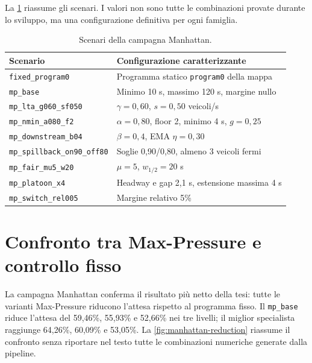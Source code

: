 \documentclass[12pt,a4paper,oneside]{report}
\numberwithin{equation}{chapter}
\begin{document}
La \cref{tab:manhattan-scenarios} riassume gli scenari. I valori non sono tutte
le combinazioni provate durante lo sviluppo, ma una configurazione definitiva
per ogni famiglia.

\begin{table}[htbp]
    \centering
    \caption{Scenari della campagna Manhattan.}
    \label{tab:manhattan-scenarios}
    \begin{tabularx}{\textwidth}{lX}
        \toprule
        Scenario & Configurazione caratterizzante \\
        \midrule
        \texttt{fixed\_program0} & Programma statico \texttt{program0} della mappa \\
        \texttt{mp\_base} & Minimo 10 s, massimo 120 s, margine nullo \\
        \texttt{mp\_lta\_g060\_sf050} & $\gamma=0{,}60$, $s=0{,}50$ veicoli/s \\
        \texttt{mp\_nmin\_a080\_f2} & $\alpha=0{,}80$, floor 2, minimo 4 s, $g=0{,}25$ \\
        \texttt{mp\_downstream\_b04} & $\beta=0{,}4$, EMA $\eta=0{,}30$ \\
        \texttt{mp\_spillback\_on90\_off80} & Soglie 0,90/0,80, almeno 3 veicoli fermi \\
        \texttt{mp\_fair\_mu5\_w20} & $\mu=5$, $w_{1/2}=20$ s \\
        \texttt{mp\_platoon\_x4} & Headway e gap 2,1 s, estensione massima 4 s \\
        \texttt{mp\_switch\_rel005} & Margine relativo 5\% \\
        \bottomrule
    \end{tabularx}
\end{table}

\section{Confronto tra Max-Pressure e controllo fisso}

La campagna Manhattan conferma il risultato più netto della tesi: tutte le
varianti Max-Pressure riducono l'attesa rispetto al programma fisso. Il
\texttt{mp\_base} riduce l'attesa del 59,46\%, 55,93\% e 52,66\% nei tre
livelli; il miglior specialista raggiunge 64,26\%, 60,09\% e 53,05\%. La
\cref{fig:manhattan-reduction} riassume il confronto senza riportare nel testo
tutte le combinazioni numeriche generate dalla pipeline.
\end{document}

